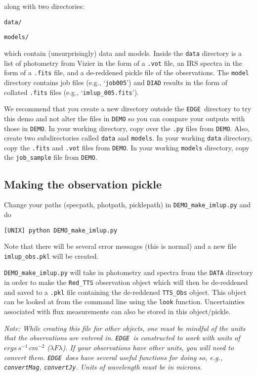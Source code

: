 \documentclass{article}
\newcommand{\edge}{\texttt{EDGE }}
\begin{document}
\noindent along with two directories:

\vspace{2mm}
\texttt{data/}

\texttt{models/}
\vspace{2mm}

which contain (unsurprisingly) data and models. Inside the \texttt{data} directory is a list of photometry from Vizier in the form of a \texttt{.vot} file,  an IRS spectra in the form of a \texttt{.fits} file, and a de-reddened pickle file of the observations. The \texttt{model} directory contains job files (e.g., `\texttt{job005}') and \texttt{DIAD} results in the form of collated \texttt{.fits} files (e.g., `\texttt{imlup\_005.fits}').

We recommend that you create a new directory outside the \edge directory to try this demo and not alter the files in \texttt{DEMO} so you can compare your outputs with those in \texttt{DEMO}.  In your working directory, copy over the \texttt{.py} files from \texttt{DEMO}. Also, create two subdirectories called \texttt{data} and \texttt{models}.  In your working \texttt{data} directory, copy the \texttt{.fits} and \texttt{.vot} files from \texttt{DEMO}.  In your working \texttt{models} directory, copy the \texttt{job\_sample} file from \texttt{DEMO}.

\subsection{Making the observation pickle}

Change your paths (specpath, photpath, picklepath) in \texttt{DEMO\_make\_imlup.py} and do

\vspace{2mm}
\texttt{[UNIX] python DEMO\_make\_imlup.py}
\vspace{2mm}

Note that there will be several error messages (this is normal) and a new file \texttt{imlup\_obs.pkl} will be created.

\texttt{DEMO\_make\_imlup.py} will take in photometry and spectra from the \texttt{DATA} directory in order to make the \texttt{Red\_TTS} observation object which will then be de-reddened and saved to a \texttt{.pkl} file containing the de-reddened \texttt{TTS\_Obs} object. This object can be looked at from the command line using the \texttt{look} function. Uncertainties associated with flux measurements can also be stored in this object/pickle.

\textit{Note: While creating this file for other objects, one must be mindful of the units that the observations are entered in. \edge is constructed to work with units of $ergs\,s^{-1}\,cm^{-2}$ ($\lambda F \lambda$). If your observations have other units, you will need to convert them. \edge does have several useful functions for doing so, e.g., \texttt{convertMag}, \texttt{convertJy}. Units of wavelength must be in microns.}
\end{document}

